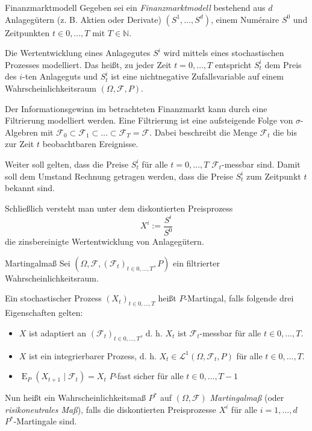 \begin{bonus}{Finanzmarktmodell}
    Gegeben sei ein \emph{Finanzmarktmodell} bestehend aus $d$ Anlagegütern (z. B. Aktien oder Derivate) $(S^{1},\dotsc ,S^{d})$, einem Numéraire $S^{0}$ und Zeitpunkten $t \in{0,\dotsc ,T}$ mit $T\in \mathbb{N}$.

    Die Wertentwicklung eines Anlagegutes $S^{i}$ wird mittels eines stochastischen Prozesses modelliert.
    Das heißt, zu jeder Zeit $t=0,\dotsc ,T$ entspricht $S_{t}^{i}$ dem Preis des $i$-ten Anlageguts und $S_{t}^{i}$ ist eine nichtnegative Zufallsvariable auf einem Wahrscheinlichkeitsraum $(\Omega ,{\mathcal{F}},P)$.

    Der Informationsgewinn im betrachteten Finanzmarkt kann durch eine Filtrierung modelliert werden. Eine Filtrierung ist eine aufsteigende Folge von $\sigma$-Algebren mit $\mathcal{F}_{0}\subset{\mathcal{F}}_{1}\subset \ldots \subset{\mathcal{F}}_{T}={\mathcal{F}}$.
    Dabei beschreibt die Menge $\mathcal{F}_{t}$ die bis zur Zeit $t$ beobachtbaren Ereignisse.

    Weiter soll gelten, dass die Preise $S_{t}^{i}$ für alle $t=0,\dotsc ,T$ $\mathcal{F}_{t}$-messbar sind.
    Damit soll dem Umstand Rechnung getragen werden, dass die Preise $S_{t}^{i}$ zum Zeitpunkt $t$ bekannt sind.

    Schließlich versteht man unter dem diskontierten Preisprozess
    \[
        X^{i} := \frac{S^{i}}{S^{0}}
    \]
    die zinsbereinigte Wertentwicklung von Anlagegütern.
\end{bonus}

\begin{defi}{Martingalmaß}
    Sei $(\Omega ,{\mathcal{F}},({\mathcal{F}}_{t})_{t\in{0,\dotsc ,T}},P)$ ein filtrierter Wahrscheinlichkeitsraum.

    Ein stochastischer Prozess $(X_{t})_{t\in{0,\dotsc ,T}}$ heißt $P$-Martingal, falls folgende drei Eigenschaften gelten:
    \begin{itemize}
        \item $X$ ist adaptiert an $({\mathcal{F}}_{t})_{t\in{0,\dotsc ,T}}$, d. h. $X_{t}$ ist $\mathcal{F}_{t}$-messbar für alle $t \in{0,\dotsc ,T}$.
        \item $X$ ist ein integrierbarer Prozess, d. h. $X_{t}\in{\mathcal{L}}^{1}(\Omega ,{\mathcal{F}}_{t},P)$ für alle $t\in{0,\dotsc ,T}$.
        \item $\operatorname{E}_{P}(X_{t+1}\mid{\mathcal{F}}_{t})=X_{t}$ $P$-fast sicher für alle $t \in{0,\dotsc ,T-1}$
    \end{itemize}

    Nun heißt ein Wahrscheinlichkeitsmaß $P^{*}$ auf $(\Omega ,{\mathcal{F}})$ \emph{Martingalmaß} (oder \emph{risikoneutrales Maß}), falls die diskontierten Preisprozesse $X^{i}$ für alle $i=1,\dotsc ,d$ $P^{*}$-Martingale sind.
\end{defi}

